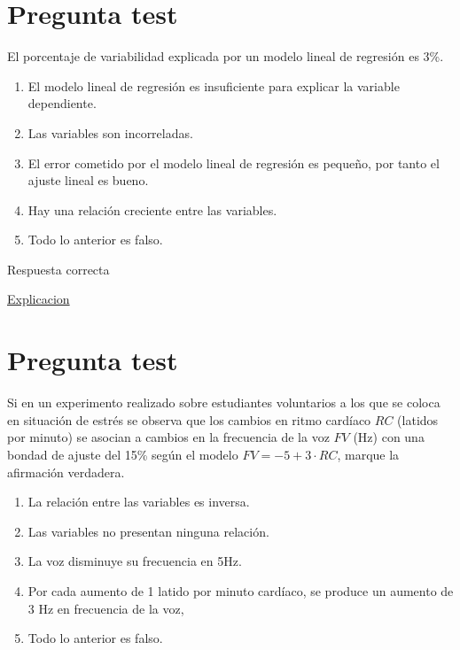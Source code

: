\documentclass[
]{book}
\providecommand{\tightlist}{%
  \setlength{\itemsep}{0pt}\setlength{\parskip}{0pt}}
\begin{document}
\hypertarget{pregunta-test-147}{%
\section{Pregunta test}\label{pregunta-test-147}}

El porcentaje de variabilidad explicada por un modelo lineal de regresión es 3\%.

\begin{enumerate}
\def\labelenumi{\alph{enumi})}
\tightlist
\item
  El modelo lineal de regresión es insuficiente para explicar la variable dependiente.
\item
  Las variables son incorreladas.
\item
  El error cometido por el modelo lineal de regresión es pequeño, por tanto el ajuste lineal es bueno.
\item
  Hay una relación creciente entre las variables.
\item
  Todo lo anterior es falso.
\end{enumerate}

Respuesta correcta

\href{https://blog.minitab.com/es/analisis-de-regresion-como-puedo-interpretar-el-r-cuadrado-y-evaluar-la-bondad-de-ajuste}{Explicacion}

\hypertarget{pregunta-test-148}{%
\section{Pregunta test}\label{pregunta-test-148}}

Si en un experimento realizado sobre estudiantes voluntarios a los que se coloca en situación de estrés se observa que los cambios en ritmo cardíaco \(RC\) (latidos por minuto) se asocian a cambios en la frecuencia de la voz \(FV\) (Hz) con una bondad de ajuste del 15\% según el modelo \(FV = -5 + 3 \cdot RC\), marque la afirmación verdadera.

\begin{enumerate}
\def\labelenumi{\alph{enumi})}
\tightlist
\item
  La relación entre las variables es inversa.
\item
  Las variables no presentan ninguna relación.
\item
  La voz disminuye su frecuencia en 5Hz.
\item
  Por cada aumento de 1 latido por minuto cardíaco, se produce un aumento de 3 Hz en frecuencia de la voz,
\item
  Todo lo anterior es falso.
\end{enumerate}
\end{document}
